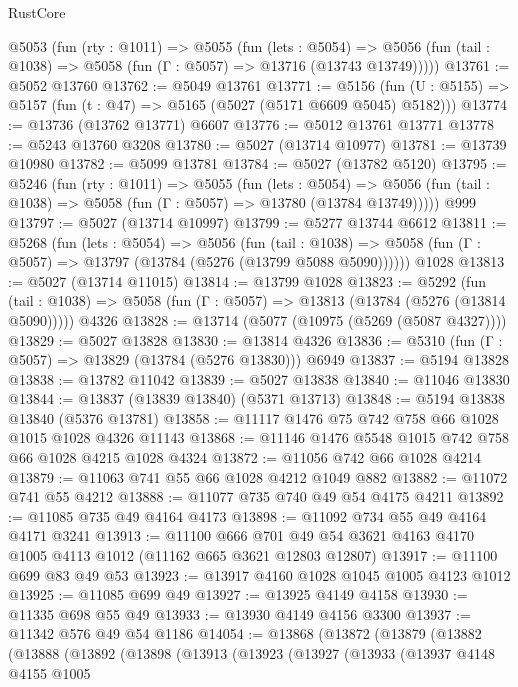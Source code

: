 \begin{lexlean}{RustCore}
\begin{coremodule}
  @5053
    (fun (rty : @1011) =>
    @5055
      (fun (lets : @5054) =>
      @5056 (fun (tail : @1038) => @5058 (fun (Γ : @5057) => @13716 (@13743 @13749)))))
@13761 := @5052 @13760
@13762 := @5049 @13761
@13771 := @5156
    (fun (U : @5155) => @5157 (fun (t : @47) => @5165 (@5027 (@5171 @6609 @5045) @5182)))
@13774 := @13736 (@13762 @13771) @6607
@13776 := @5012 @13761 @13771
@13778 := @5243 @13760 @3208
@13780 := @5027 (@13714 @10977)
@13781 := @13739 @10980
@13782 := @5099 @13781
@13784 := @5027 (@13782 @5120)
@13795 := @5246
    (fun (rty : @1011) =>
    @5055
      (fun (lets : @5054) =>
      @5056 (fun (tail : @1038) => @5058 (fun (Γ : @5057) => @13780 (@13784 @13749)))))
    @999
@13797 := @5027 (@13714 @10997)
@13799 := @5277 @13744 @6612
@13811 := @5268
    (fun (lets : @5054) =>
    @5056
      (fun (tail : @1038) =>
      @5058 (fun (Γ : @5057) => @13797 (@13784 (@5276 (@13799 @5088 @5090))))))
    @1028
@13813 := @5027 (@13714 @11015)
@13814 := @13799 @1028
@13823 := @5292
    (fun (tail : @1038) => @5058 (fun (Γ : @5057) => @13813 (@13784 (@5276 (@13814 @5090)))))
    @4326
@13828 := @13714 (@5077 (@10975 (@5269 (@5087 @4327))))
@13829 := @5027 @13828
@13830 := @13814 @4326
@13836 := @5310 (fun (Γ : @5057) => @13829 (@13784 (@5276 @13830))) @6949
@13837 := @5194 @13828
@13838 := @13782 @11042
@13839 := @5027 @13838
@13840 := @11046 @13830
@13844 := @13837 (@13839 @13840) (@5371 @13713)
@13848 := @5194 @13838 @13840 (@5376 @13781)
@13858 := @11117 @1476 @75 @742 @758 @66 @1028 @1015 @1028 @4326 @11143
@13868 := @11146 @1476 @5548 @1015 @742 @758 @66 @1028 @4215 @1028 @4324
@13872 := @11056 @742 @66 @1028 @4214
@13879 := @11063 @741 @55 @66 @1028 @4212 @1049 @882
@13882 := @11072 @741 @55 @4212
@13888 := @11077 @735 @740 @49 @54 @4175 @4211
@13892 := @11085 @735 @49 @4164 @4173
@13898 := @11092 @734 @55 @49 @4164 @4171 @3241
@13913 := @11100
    @666
    @701
    @49
    @54
    @3621
    @4163
    @4170
    @1005
    @4113
    @1012
    (@11162 @665 @3621 @12803 @12807)
@13917 := @11100 @699 @83 @49 @53
@13923 := @13917 @4160 @1028 @1045 @1005 @4123 @1012
@13925 := @11085 @699 @49
@13927 := @13925 @4149 @4158
@13930 := @11335 @698 @55 @49
@13933 := @13930 @4149 @4156 @3300
@13937 := @11342 @576 @49 @54 @1186
@14054 := @13868
    (@13872
      (@13879
        (@13882
          (@13888
            (@13892
              (@13898
                (@13913
                  (@13923
                    (@13927
                      (@13933
                        (@13937
                          @4148
                          @4155
                          @1005

\end{coremodule}
\end{lexlean}
